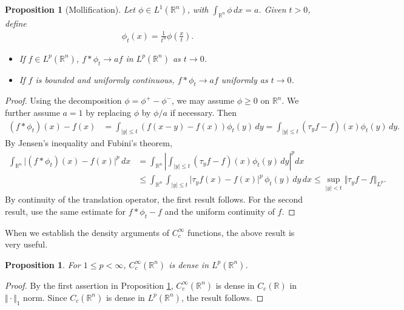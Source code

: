 \documentclass{article}
\numberwithin{equation}{section}
\newcommand{\bbR}{\mathbb{R}}
\theoremstyle{plain}
\newtheorem{proposition}[theorem]{Proposition}
\theoremstyle{definition}
\begin{document}
\begin{proposition}[Mollification]\label{generalmollif}
	Let $\phi\in L^1(\bbR^n)$, with $\int_{\bbR^n}\phi\,dx=a$. Given $t>0$, define
	\begin{align}
	\phi_t(x)=\frac{1}{t^n}\phi\left(\frac{x}{t}\right).\label{shrinkage}
	\end{align}
	\begin{itemize}
		\item[(i)] If $f\in L^p(\bbR^n)$, $f*\phi_t\to af$ in $L^p(\bbR^n)$ as $t\to 0$.
		\item[(ii)] If $f$ is bounded and uniformly continuous, $f*\phi_t\to af$ uniformly as $t\to 0$. 
	\end{itemize}
\end{proposition}
\begin{proof}
	Using the decomposition $\phi=\phi^+-\phi^-$, we may assume $\phi\geq 0$ on $\bbR^n$. We further assume $a=1$ by replacing $\phi$ by $\phi/a$ if necessary. Then
	\begin{align*}
		(f *\phi_t)(x) - f(x) &= \int_{\vert y\vert\leq t} (f(x-y)-f(x))\phi_t(y)\,dy=\int_{\vert y\vert\leq t}(\tau_yf-f)(x)\phi_t(y)\,dy.
	\end{align*}
	By Jensen's inequality and Fubini's theorem,
	\begin{align*}
		\int_{\bbR^n}\vert(f *\phi_t)(x) - f(x)\vert^p\,dx&=\int_{\bbR^n}\left\vert\int_{\vert y\vert\leq t}(\tau_yf-f)(x)\phi_t(y)\,dy\right\vert^p dx\\
		&\leq \int_{\bbR^n}\int_{\vert y\vert\leq t}\vert\tau_y f (x)-f(x)\vert^p\,\phi_t(y)\,dy\,dx\leq\sup_{\vert y\vert<t}\Vert\tau_y f-f\Vert_{L^p}.
	\end{align*}
	By continuity of the translation operator, the first result follows. For the second result, use the same estimate for $f*\phi_t-f$ and the uniform continuity of $f$.
\end{proof}

When we establish the density arguments of $C_c^\infty$ functions, the above result is very useful.
\begin{proposition}\label{prop:1.6}
	For $1\leq p <\infty$, $C_c^\infty(\mathbb{R}^n)$ is dense in $L^p(\mathbb{R}^n)$.
\end{proposition}
\begin{proof}
By the first assertion in Proposition \ref{generalmollif}, $C^\infty_c(\bbR^n)$ is dense in $C_c(\bbR)$ in $\Vert\cdot\Vert_1$ norm. Since $C_c(\bbR^n)$ is dense in $L^p(\bbR^n)$, the result follows.
\end{proof}
\end{document}
